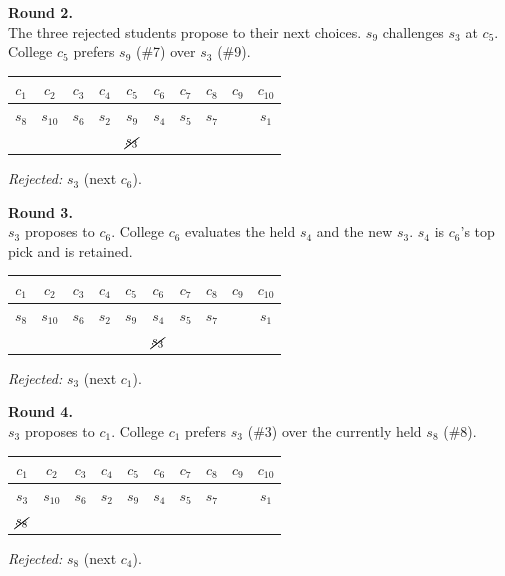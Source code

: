 {\medskip
\noindent\textbf{Round 2.} \\
The three rejected students propose to their next choices. $s_9$ challenges $s_3$ at $c_5$. College $c_5$ prefers $s_9$ (\#7) over $s_3$ (\#9).
\begin{center}
\renewcommand{\arraystretch}{1.2}
\begin{tabular}{cccccccccc}
    $c_1$ & $c_2$ & $c_3$ & $c_4$ & $c_5$ & $c_6$ & $c_7$ & $c_8$ & $c_9$ & $c_{10}$ \\
    \hline
    $s_8$ & $s_{10}$ & $s_6$ & $s_2$ & $s_9$ & $s_4$ & $s_5$ & $s_7$ & & $s_1$ \\
     & & & & $\cancel{s_3}$ & & & & & \\
\end{tabular}
\end{center}
\textit{Rejected:} $s_3$ (next $c_6$).

\medskip
\noindent\textbf{Round 3.} \\
$s_3$ proposes to $c_6$. College $c_6$ evaluates the held $s_4$ and the new $s_3$. $s_4$ is $c_6$'s top pick and is retained.
\begin{center}
\renewcommand{\arraystretch}{1.2}
\begin{tabular}{cccccccccc}
    $c_1$ & $c_2$ & $c_3$ & $c_4$ & $c_5$ & $c_6$ & $c_7$ & $c_8$ & $c_9$ & $c_{10}$ \\
    \hline
    $s_8$ & $s_{10}$ & $s_6$ & $s_2$ & $s_9$ & $s_4$ & $s_5$ & $s_7$ & & $s_1$ \\
     & & & & & $\cancel{s_3}$ & & & & \\
\end{tabular}
\end{center}
\textit{Rejected:} $s_3$ (next $c_1$).

\medskip
\noindent\textbf{Round 4.} \\
$s_3$ proposes to $c_1$. College $c_1$ prefers $s_3$ (\#3) over the currently held $s_8$ (\#8).
\begin{center}
\renewcommand{\arraystretch}{1.2}
\begin{tabular}{cccccccccc}
    $c_1$ & $c_2$ & $c_3$ & $c_4$ & $c_5$ & $c_6$ & $c_7$ & $c_8$ & $c_9$ & $c_{10}$ \\
    \hline
    $s_3$ & $s_{10}$ & $s_6$ & $s_2$ & $s_9$ & $s_4$ & $s_5$ & $s_7$ & & $s_1$ \\
    $\cancel{s_8}$ & & & & & & & & & \\
\end{tabular}
\end{center}
\textit{Rejected:} $s_8$ (next $c_4$).

}
